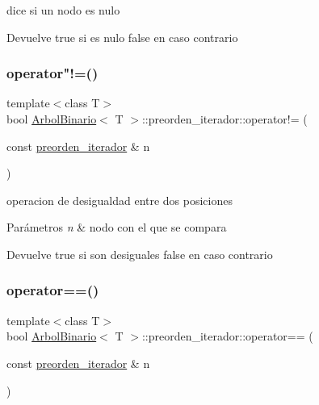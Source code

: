 dice si un nodo es nulo 

\begin{DoxyReturn}{Devuelve}
true si es nulo false en caso contrario 
\end{DoxyReturn}
\mbox{\label{classArbolBinario_1_1preorden__iterador_a484dec30f4c2c6084cd5bbcefe7ccfa8}} 
\subsubsection{\texorpdfstring{operator"!=()}{operator!=()}}
{\footnotesize\ttfamily template$<$class T$>$ \\
bool \hyperlink{classArbolBinario}{Arbol\+Binario}$<$ T $>$\+::preorden\+\_\+iterador\+::operator!= (\begin{DoxyParamCaption}\item[{const \hyperlink{classArbolBinario_1_1preorden__iterador}{preorden\+\_\+iterador} \&}]{n }\end{DoxyParamCaption})\hspace{0.3cm}{\ttfamily [inline]}}



operacion de desigualdad entre dos posiciones 


\begin{DoxyParams}{Parámetros}
{\em n} & nodo con el que se compara \\
\hline
\end{DoxyParams}
\begin{DoxyReturn}{Devuelve}
true si son desiguales false en caso contrario 
\end{DoxyReturn}
\mbox{\label{classArbolBinario_1_1preorden__iterador_abe1fbd66b147f97257a25be21db67b3f}} 
\subsubsection{\texorpdfstring{operator==()}{operator==()}}
{\footnotesize\ttfamily template$<$class T$>$ \\
bool \hyperlink{classArbolBinario}{Arbol\+Binario}$<$ T $>$\+::preorden\+\_\+iterador\+::operator== (\begin{DoxyParamCaption}\item[{const \hyperlink{classArbolBinario_1_1preorden__iterador}{preorden\+\_\+iterador} \&}]{n }\end{DoxyParamCaption})\hspace{0.3cm}{\ttfamily [inline]}}



